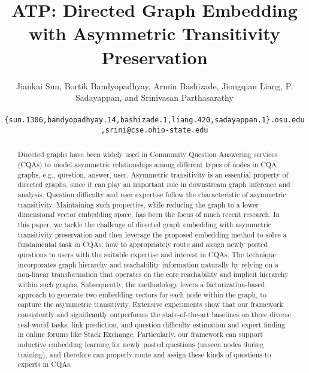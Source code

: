 \documentclass[letterpaper]{article} \usepackage{aaai19}  \usepackage{times}  \usepackage{helvet}  \usepackage{courier}  \usepackage{url}  \usepackage{graphicx}  \usepackage{booktabs} \usepackage{xcolor}
\newcommand*{\email}[1]{\texttt{#1}}
\begin{document}
\title{ATP: Directed Graph Embedding with Asymmetric Transitivity Preservation}
\author{\small Jiankai Sun,
Bortik Bandyopadhyay, Armin Bashizade, Jiongqian Liang, P. Sadayappan, and Srinivasan Parthasarathy\\
\\
\email{\footnotesize \{sun.1306,bandyopadhyay.14,bashizade.1,liang.420,sadayappan.1\}.osu.edu,srini@cse.ohio-state.edu}\\
}
\maketitle
\begin{abstract}
Directed graphs have been widely used in Community Question Answering services (CQAs) to model asymmetric relationships among different types of nodes in CQA graphs, e.g., question, answer, user. Asymmetric transitivity is an essential property of directed graphs, since it can play an important role in downstream graph inference and analysis. Question difficulty and user expertise follow the characteristic of asymmetric transitivity. 
Maintaining such properties, while reducing the graph to a lower dimensional vector embedding space, has been the focus of much recent research. 
In this paper, we tackle the challenge of directed graph embedding with asymmetric transitivity preservation and then leverage the proposed embedding method to solve a fundamental task in CQAs: how to appropriately route and assign newly posted questions to users with the suitable expertise and interest in CQAs. The technique incorporates graph hierarchy and reachability information naturally by relying on a non-linear transformation that operates on the core reachability and implicit hierarchy within such graphs. Subsequently, the methodology levers a factorization-based approach to generate two embedding vectors for each node within the graph, to capture the asymmetric transitivity. Extensive experiments show that our framework consistently and significantly outperforms the state-of-the-art baselines on three diverse real-world tasks: link prediction, and question difficulty estimation and expert finding in online forums like Stack Exchange. Particularly, our framework can support inductive embedding learning for newly posted questions (unseen nodes during training), and therefore can properly route and assign these kinds of questions to experts in CQAs.
\end{abstract}
\end{document}
